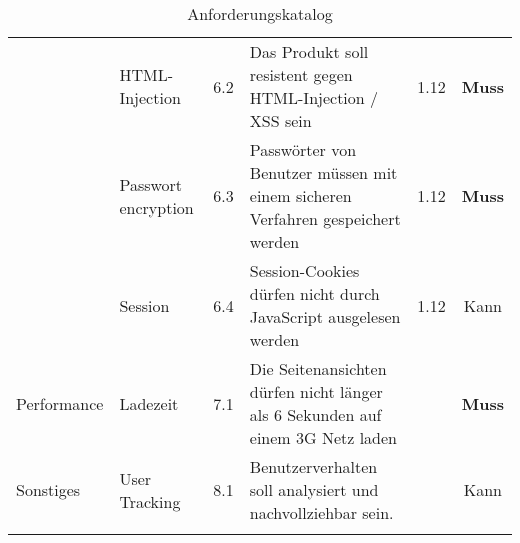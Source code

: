 \begin{longtable}[]{@{}p{1.9cm}p{2.5cm}cp{5.5cm}cc@{}}
                             & HTML-Injection             & 6.2          & Das Produkt soll resistent gegen HTML-Injection / XSS sein                                                  & 1.12          & \textbf{Muss}                \\ \cline{2-6}
                             & Passwort encryption        & 6.3          & Passwörter von Benutzer müssen mit einem sicheren Verfahren gespeichert werden                              & 1.12          & \textbf{Muss}                \\ \cline{2-6}
                             & Session                    & 6.4          & Session-Cookies dürfen nicht durch JavaScript ausgelesen werden                                             & 1.12          & Kann                         \\
  \midrule
  Performance                & Ladezeit                   & 7.1          & Die Seitenansichten dürfen nicht länger als 6 Sekunden auf einem 3G Netz laden                              &               & \textbf{Muss}                \\
  \midrule
  Sonstiges                  & User Tracking              & 8.1          & Benutzerverhalten soll analysiert und nachvollziehbar sein.                                                 &               & Kann                         \\
  \bottomrule
  \caption{Anforderungskatalog}
\end{longtable}
